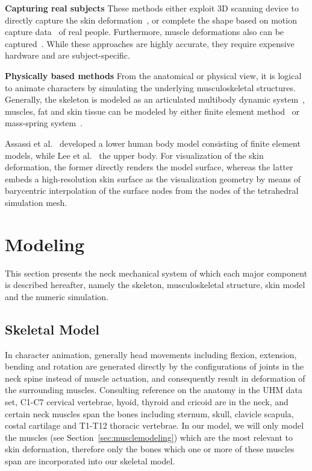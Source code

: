 \textbf{Capturing real subjects}
These methods either exploit 3D scanning device to directly
capture the skin deformation~\cite{Allen:2003:SHB}, or complete the shape based on motion capture data~\cite{Park:2008:DMS,Anguelov:2005:SSC} of real people. Furthermore, muscle deformations also can be captured~\cite{Neumann:2013:muscles}. While these approaches are highly accurate, they require expensive hardware and are subject-specific.

\textbf{Physically based methods}
From the anatomical or physical view, it is logical to
animate characters by simulating the underlying musculoskeletal structures. Generally, the skeleton is modeled as an articulated multibody dynamic system~\cite{Lee:2006:HUB,Stavness:2011:CNM}, muscles, fat and skin tissue can be modeled by either finite element method~\cite{Capell:2002:ISD,Georgii:2010:SkeletalFEM,Muller:2002:SRD} or mass-spring system~\cite{Zordan:2004:breathe,Zhang:2004:NPM,Fratarcangeli:2005:physically}.

Assassi et al.~\cite{Assassi:2012:dynamic} developed a lower human body model consisting of finite element models, while Lee et al.~\cite{Lee:2009:CBM} the upper body. For visualization of the skin deformation, the former directly renders the model surface, whereas the latter embeds a high-resolution skin surface as the visualization geometry by means of barycentric interpolation of the surface nodes from the nodes of the tetrahedral simulation mesh.

\section{Modeling}
\label{modeling}
This section presents the neck mechanical system of which each major component is described hereafter, namely the skeleton, musculoskeletal structure, skin model and the numeric simulation.

\subsection{Skeletal Model}
\label{sec:skeletalmodel}
In character animation, generally head movements including flexion, extension, bending and rotation are generated directly by the configurations of joints in the neck spine instead of muscle actuation, and consequently result in deformation of the surrounding muscles. Consulting reference on the anatomy in the UHM data set, C1-C7 cervical vertebrae, hyoid, thyroid and cricoid are in the neck, and certain neck muscles span the bones including sternum, skull, clavicle scapula, costal cartilage and T1-T12 thoracic vertebrae. In our model, we will only model the muscles (see Section~\ref{sec:musclemodeling}) which are the most relevant to skin deformation, therefore only the bones which one or more of these muscles span are incorporated into our skeletal model.

